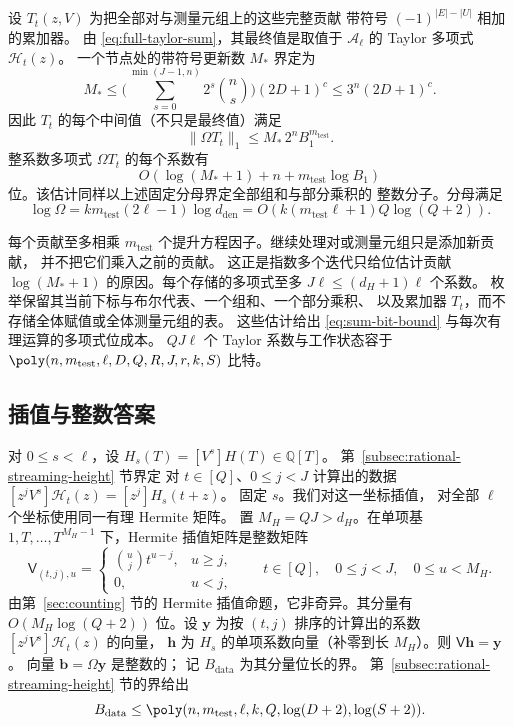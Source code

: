 设 $T_t(z,V)$ 为把全部对与测量元组上的这些完整贡献
带符号 $(-1)^{|E|-|U|}$ 相加的累加器。
由 \eqref{eq:full-taylor-sum}，其最终值是取值于
$\mathcal A_\ell$ 的 Taylor 多项式
$\mathcal H_t(z)$。
一个节点处的带符号更新数 $M_*$ 界定为
\[
 M_*\le
 \biggl(\sum_{s=0}^{\min(J-1,n)}2^s\binom ns\biggr)(2D+1)^c
 \le3^n(2D+1)^c.
\]
因此 $T_t$ 的每个中间值（不只是最终值）满足
\[
 \|\Omega T_t\|_1
 \le M_*\,2^nB_1^{m_{\mathrm{test}}}.
\]
整系数多项式 $\Omega T_t$ 的每个系数有
\[
 O\!\left(\log(M_*+1)+n+m_{\mathrm{test}}\log B_1\right)
\]
位。该估计同样以上述固定分母界定全部组和与部分乘积的
整数分子。分母满足
\[
 \log\Omega
 =k m_{\mathrm{test}}(2\ell-1)\log d_{\mathrm{den}}
 =O\!\left(k(m_{\mathrm{test}}\ell+1)Q\log(Q+2)\right).
\]

每个贡献至多相乘 $m_{\mathrm{test}}$
个提升方程因子。继续处理对或测量元组只是添加新贡献，
并不把它们乘入之前的贡献。
这正是指数多个迭代只给位估计贡献 $\log(M_*+1)$
的原因。每个存储的多项式至多
$J\ell\le(d_H+1)\ell$ 个系数。
枚举保留其当前下标与布尔代表、一个组和、一个部分乘积、
以及累加器 $T_t$，而不存储全体赋值或全体测量元组的表。
这些估计给出 \eqref{eq:sum-bit-bound}
与每次有理运算的多项式位成本。
$QJ\ell$ 个 Taylor 系数与工作状态容于
$\poly(n,m_{\mathrm{test}},\ell,D,Q,R,J,r,k,S)$
比特。

\subsection{插值与整数答案}
\label{subsec:rational-readout}
对 $0\le s<\ell$，设 $H_s(T)=[V^s]H(T)\in\mathbb Q[T]$。
第~\ref{subsec:rational-streaming-height} 节界定
对 $t\in[Q]$、$0\le j<J$ 计算出的数据
$[z^jV^s]\mathcal H_t(z)=[z^j]H_s(t+z)$。
固定 $s$。我们对这一坐标插值，
对全部 $\ell$ 个坐标使用同一有理 Hermite 矩阵。
置 $M_H=QJ>d_H$。在单项基
$1,T,\ldots,T^{M_H-1}$ 下，Hermite 插值矩阵是整数矩阵
\[
 \mathsf V_{(t,j),u}=
 \begin{cases}\binom uj t^{u-j},&u\ge j,\\0,&u<j,\end{cases}
 \qquad t\in[Q],\quad 0\le j<J,\quad 0\le u<M_H.
\]
由第~\ref{sec:counting} 节的 Hermite
插值命题，它非奇异。其分量有 $O(M_H\log(Q+2))$
位。设 $\mathbf y$ 为按 $(t,j)$ 排序的计算出的系数
$[z^jV^s]\mathcal H_t(z)$ 的向量，
$\mathbf h$ 为 $H_s$ 的单项系数向量（补零到长
$M_H$）。则 $\mathsf V\mathbf h=\mathbf y$。
向量 $\mathbf b=\Omega\mathbf y$ 是整数的；
记 $B_{\mathrm{data}}$ 为其分量位长的界。
第~\ref{subsec:rational-streaming-height} 节的界给出
\[
 B_{\mathrm{data}}
 \le\poly(n,m_{\mathrm{test}},\ell,k,Q,\log(D+2),\log(S+2)).
\]

